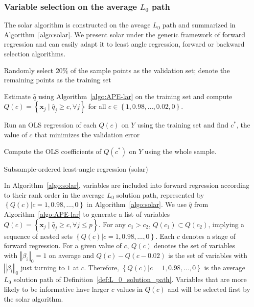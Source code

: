 \documentclass[11pt,review,authoryear]{elsarticle}
\begin{document}
\subsubsection{Variable selection on the average $L_0$ path}

The solar algorithm is constructed on the aveage $L_0$ path and summarized in Algorithm~\ref{algo:solar}. We present solar under the generic framework of forward regression and can easily adapt it to least angle regression, forward or backward selection algorithms.


\begin{algorithm}[ht]


  \smallskip
  Randomly select 20\% of the sample points as the validation set; denote the remaining points as the training set\;

  Estimate $\widehat{q}$ using Algorithm~\ref{algo:APE-lar} on the training set and compute $Q(c) = \left\{ \mathbf{x}_j \; \vert \; \widehat{q}_j \geqslant c, \forall j\right\}$ for all $c \in \left\{ 1, 0.98, \ldots, 0.02, 0 \right\}.$

  Run an OLS regression of each $Q(c)$ on $Y$ using the training set and find $c^*$, the value of $c$ that minimizes the validation error\;

  Compute the OLS coefficients of $Q(c^*)$ on $Y$ using the whole sample.

  \caption{Subsample-ordered least-angle regression (solar) \label{algo:solar}}
\end{algorithm}


In Algorithm~\ref{algo:solar}, variables are included into forward regression according to their rank order in the average $L_0$ solution path, represented by $\left\{ Q(c) \vert c = 1, 0.98, \ldots, 0\right\}$ in Algorithm~\ref{algo:solar}. We use $\widehat{q}$ from Algorithm~\ref{algo:APE-lar} to generate a list of variables $Q \left( c \right) = \left\{ \mathbf{x}_j \; \vert \; \widehat{q}_j \geqslant c, \forall j \leqslant p \right\}$. For any $c_1 > c_2$, $Q\left(c_1\right) \subset Q\left(c_2\right)$, implying a sequence of nested sets $\left\{ Q(c) \vert c = 1, 0.98, \ldots, 0\right\}$. Each $c$ denotes a stage of forward regression. For a given value of $c$, $Q(c)$ denotes the set of variables with $\left\Vert \beta_i \right\Vert_0=1$ on average and $Q(c) - Q(c - 0.02)$ is the set of variables with $\left\Vert \beta_i \right\Vert_0$ just turning to $1$ at $c$. Therefore, $\left\{ Q(c) \vert c = 1, 0.98, \ldots, 0\right\}$ is the average $L_0$ solution path of Definition~\ref{def:L_0_solution_path}. Variables that are more likely to be informative have larger $c$ values in $Q(c)$ and will be selected first by the solar algorithm.
\end{document}
